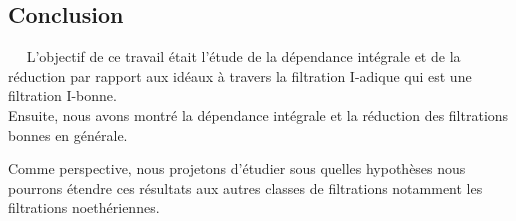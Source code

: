 \begin{center}
	\chapter*{Conclusion}
\end{center}

$ \quad $ L'objectif de ce travail était l'étude de la dépendance intégrale et de la réduction par rapport aux idéaux à travers la filtration I-adique qui est une filtration I-bonne. \\
Ensuite, nous avons montré la dépendance intégrale et la réduction des filtrations bonnes en générale.

Comme perspective, nous projetons d'étudier sous quelles hypothèses nous pourrons étendre ces résultats aux autres classes de filtrations notamment les filtrations noethériennes.



